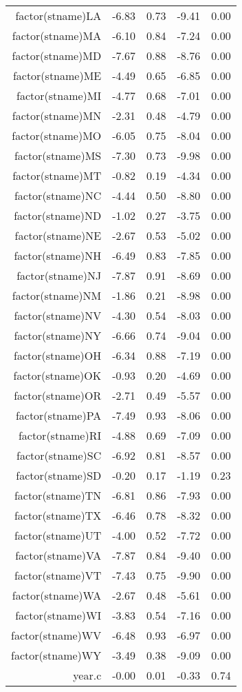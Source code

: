 \begin{table}[ht]
\begin{tabular}{rrrrr}
  factor(stname)LA & -6.83 & 0.73 & -9.41 & 0.00 \\ 
  factor(stname)MA & -6.10 & 0.84 & -7.24 & 0.00 \\ 
  factor(stname)MD & -7.67 & 0.88 & -8.76 & 0.00 \\ 
  factor(stname)ME & -4.49 & 0.65 & -6.85 & 0.00 \\ 
  factor(stname)MI & -4.77 & 0.68 & -7.01 & 0.00 \\ 
  factor(stname)MN & -2.31 & 0.48 & -4.79 & 0.00 \\ 
  factor(stname)MO & -6.05 & 0.75 & -8.04 & 0.00 \\ 
  factor(stname)MS & -7.30 & 0.73 & -9.98 & 0.00 \\ 
  factor(stname)MT & -0.82 & 0.19 & -4.34 & 0.00 \\ 
  factor(stname)NC & -4.44 & 0.50 & -8.80 & 0.00 \\ 
  factor(stname)ND & -1.02 & 0.27 & -3.75 & 0.00 \\ 
  factor(stname)NE & -2.67 & 0.53 & -5.02 & 0.00 \\ 
  factor(stname)NH & -6.49 & 0.83 & -7.85 & 0.00 \\ 
  factor(stname)NJ & -7.87 & 0.91 & -8.69 & 0.00 \\ 
  factor(stname)NM & -1.86 & 0.21 & -8.98 & 0.00 \\ 
  factor(stname)NV & -4.30 & 0.54 & -8.03 & 0.00 \\ 
  factor(stname)NY & -6.66 & 0.74 & -9.04 & 0.00 \\ 
  factor(stname)OH & -6.34 & 0.88 & -7.19 & 0.00 \\ 
  factor(stname)OK & -0.93 & 0.20 & -4.69 & 0.00 \\ 
  factor(stname)OR & -2.71 & 0.49 & -5.57 & 0.00 \\ 
  factor(stname)PA & -7.49 & 0.93 & -8.06 & 0.00 \\ 
  factor(stname)RI & -4.88 & 0.69 & -7.09 & 0.00 \\ 
  factor(stname)SC & -6.92 & 0.81 & -8.57 & 0.00 \\ 
  factor(stname)SD & -0.20 & 0.17 & -1.19 & 0.23 \\ 
  factor(stname)TN & -6.81 & 0.86 & -7.93 & 0.00 \\ 
  factor(stname)TX & -6.46 & 0.78 & -8.32 & 0.00 \\ 
  factor(stname)UT & -4.00 & 0.52 & -7.72 & 0.00 \\ 
  factor(stname)VA & -7.87 & 0.84 & -9.40 & 0.00 \\ 
  factor(stname)VT & -7.43 & 0.75 & -9.90 & 0.00 \\ 
  factor(stname)WA & -2.67 & 0.48 & -5.61 & 0.00 \\ 
  factor(stname)WI & -3.83 & 0.54 & -7.16 & 0.00 \\ 
  factor(stname)WV & -6.48 & 0.93 & -6.97 & 0.00 \\ 
  factor(stname)WY & -3.49 & 0.38 & -9.09 & 0.00 \\ 
  year.c & -0.00 & 0.01 & -0.33 & 0.74 \\ 
   \hline
\end{tabular}
\end{table}
